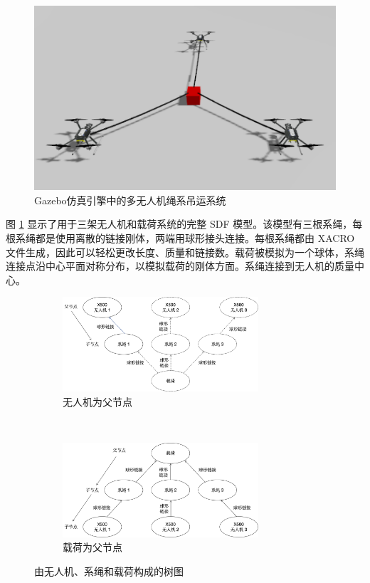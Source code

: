 \documentclass[lang=chs, degree=master, blindreview=true, winfonts=true]{yanputhesis}
\begin{document}
\begin{figure}[hbt!]
	\centering
	\includegraphics[width=36pc]{picture/5_2.png} 
	\caption{Gazebo仿真引擎中的多无人机绳系吊运系统} 
	\label{5_2}
\end{figure}

图 \ref{5_2} 显示了用于三架无人机和载荷系统的完整 SDF 模型。该模型有三根系绳，每根系绳都是使用离散的链接刚体，两端用球形接头连接。每根系绳都由 XACRO 文件生成，因此可以轻松更改长度、质量和链接数。载荷被模拟为一个球体，系绳连接点沿中心平面对称分布，以模拟载荷的刚体方面。系绳连接到无人机的质量中心。

\begin{figure}[hbt!]
	\centering
	\begin{subfigure}[t]{0.9\textwidth}
		\centering
		\includegraphics[width=0.8\textwidth]{picture/tree2.png}
		\caption{无人机为父节点}
		\label{tree1}
	\end{subfigure}\\[2ex] %
	\begin{subfigure}[t]{0.9\textwidth}
		\centering
		\includegraphics[width=0.8\textwidth]{picture/tree1.png}
		\caption{载荷为父节点}
		\label{tree2}
	\end{subfigure}
	\caption{由无人机、系绳和载荷构成的树图}
	\label{tree_combined}
\end{figure}
\end{document}
